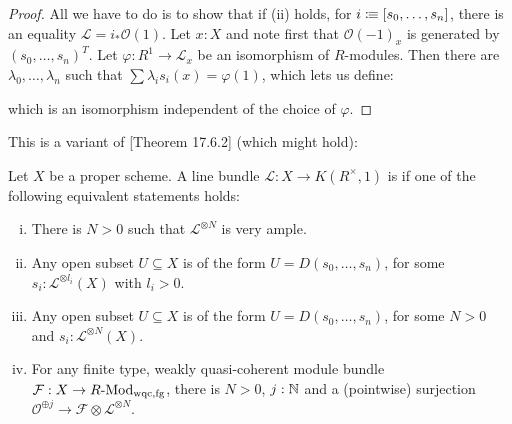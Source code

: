 \begin{proof}
  All we have to do is to show that if (ii) holds, for $i\vcentcolon\mspace{-1.2mu}\equiv [s_0,\dots,s_n]$,
  there is an equality $\mathcal L=i_\ast \mathcal O(1)$.
  Let $x:X$ and note first that $\mathcal O(-1)_x$ is generated by $(s_0,\dots,s_n)^T$.
  Let $\varphi:R^1\to \mathcal L_x$ be an isomorphism of $R$-modules.
  Then there are $\lambda_0,\dots,\lambda_n$ such that $\sum \lambda_i s_i(x) =\varphi(1)$,
  which lets us define:
  \begin{center}
  \end{center}
  which is an isomorphism independent of the choice of $\varphi$.
\end{proof}

This is a variant of \cite{vakil}[Theorem 17.6.2] (which might hold):

\begin{definition}
  Let $X$ be a proper scheme.
  A line bundle $\mathcal L : X\to K(R^\times,1)$ is 
  if one of the following equivalent statements holds:
  \begin{enumerate}[(i)]
  \item There is $N>0$ such that $\mathcal L^{\otimes N}$ is very ample.
  \item Any open subset $U\subseteq X$ is of the form $U=D(s_0,\dots,s_n)$,
    for some $s_i:\mathcal L^{\otimes l_i}(X)$ with $l_i>0$.
  \item Any open subset $U\subseteq X$ is of the form $U=D(s_0,\dots,s_n)$,
    for some $N>0$ and $s_i:\mathcal L^{\otimes N}(X)$.
  \item For any finite type, weakly quasi-coherent module bundle $\mathcal F:X\to R\text{-}\mathrm{Mod}_{\mathrm{wqc,fg}}$,
    there is $N>0$, $j:\mathbb{N}$ and a (pointwise) surjection
    $\mathcal O^{\oplus j}\to \mathcal F\otimes \mathcal L^{\otimes N}$.
  \end{enumerate}
\end{definition}
